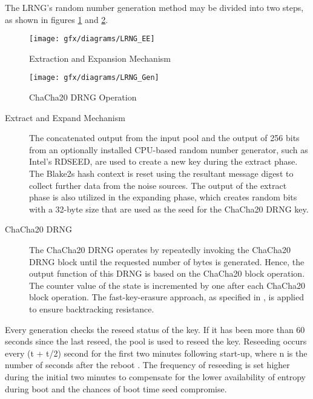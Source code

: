 \begin{description}
	The LRNG’s random number generation method may be divided into two steps, as shown in figures \ref{fig:3:17} and \ref{fig:3:18}. 
	\begin{figure}[htbp]
		\centering
		\texttt{[image: gfx/diagrams/LRNG\_EE]}
		\caption{Extraction and Expansion Mechanism \cite{LRNG-2022}}
		\label{fig:3:17}
	\end{figure}
	
	\begin{figure}[htbp]
		\centering
		\texttt{[image: gfx/diagrams/LRNG\_Gen]}
		\caption{ChaCha20 DRNG Operation \cite{LRNG-2022}}
		\label{fig:3:18}
	\end{figure}
	
	\begin{description}
		\item[Extract and Expand Mechanism] The concatenated output from the input pool and the output of 256 bits from an optionally installed CPU-based random number generator, such as Intel’s RDSEED, are used to create a new key during the extract phase. The Blake2s hash context is reset using the resultant message digest to collect further data from the noise sources. The output of the extract phase is also utilized in the expanding phase, which creates random bits with a 32-byte size that are used as the seed for the ChaCha20 DRNG key.
		
		\item[ChaCha20 DRNG] The ChaCha20 DRNG operates by repeatedly invoking the ChaCha20 DRNG block until the requested number of bytes is generated. Hence, the output function of this DRNG is based on the ChaCha20 block operation. The counter value of the state is incremented by one after each ChaCha20 block operation. The fast-key-erasure approach, as specified in \cite{LRNG-2022}, is applied to ensure backtracking resistance.
	\end{description}
	
\end{description}

Every generation checks the reseed status of the key. If it has been more than 60 seconds since the last reseed, the pool is used to reseed the key. Reseeding occurs every (t + t/2) second for the first two minutes following start-up, where n is the number of seconds after the reboot \cite{LRNG-2022}. The frequency of reseeding is set higher during the initial two minutes to compensate for the lower availability of entropy during boot and the chances of boot time seed compromise.

